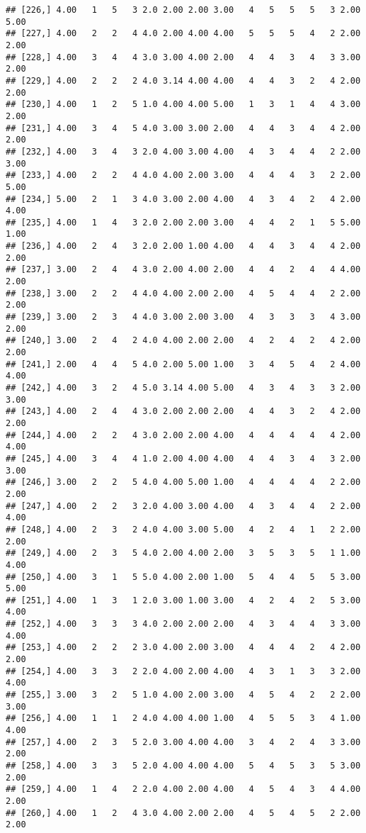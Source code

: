 \documentclass[]{article}
\begin{document}
\begin{verbatim}
## [226,] 4.00   1   5   3 2.0 2.00 2.00 3.00   4   5   5   5   3 2.00 5.00
## [227,] 4.00   2   2   4 4.0 2.00 4.00 4.00   5   5   5   4   2 2.00 2.00
## [228,] 4.00   3   4   4 3.0 3.00 4.00 2.00   4   4   3   4   3 3.00 2.00
## [229,] 4.00   2   2   2 4.0 3.14 4.00 4.00   4   4   3   2   4 2.00 2.00
## [230,] 4.00   1   2   5 1.0 4.00 4.00 5.00   1   3   1   4   4 3.00 2.00
## [231,] 4.00   3   4   5 4.0 3.00 3.00 2.00   4   4   3   4   4 2.00 2.00
## [232,] 4.00   3   4   3 2.0 4.00 3.00 4.00   4   3   4   4   2 2.00 3.00
## [233,] 4.00   2   2   4 4.0 4.00 2.00 3.00   4   4   4   3   2 2.00 5.00
## [234,] 5.00   2   1   3 4.0 3.00 2.00 4.00   4   3   4   2   4 2.00 4.00
## [235,] 4.00   1   4   3 2.0 2.00 2.00 3.00   4   4   2   1   5 5.00 1.00
## [236,] 4.00   2   4   3 2.0 2.00 1.00 4.00   4   4   3   4   4 2.00 2.00
## [237,] 3.00   2   4   4 3.0 2.00 4.00 2.00   4   4   2   4   4 4.00 2.00
## [238,] 3.00   2   2   4 4.0 4.00 2.00 2.00   4   5   4   4   2 2.00 2.00
## [239,] 3.00   2   3   4 4.0 3.00 2.00 3.00   4   3   3   3   4 3.00 2.00
## [240,] 3.00   2   4   2 4.0 4.00 2.00 2.00   4   2   4   2   4 2.00 2.00
## [241,] 2.00   4   4   5 4.0 2.00 5.00 1.00   3   4   5   4   2 4.00 4.00
## [242,] 4.00   3   2   4 5.0 3.14 4.00 5.00   4   3   4   3   3 2.00 3.00
## [243,] 4.00   2   4   4 3.0 2.00 2.00 2.00   4   4   3   2   4 2.00 2.00
## [244,] 4.00   2   2   4 3.0 2.00 2.00 4.00   4   4   4   4   4 2.00 4.00
## [245,] 4.00   3   4   4 1.0 2.00 4.00 4.00   4   4   3   4   3 2.00 3.00
## [246,] 3.00   2   2   5 4.0 4.00 5.00 1.00   4   4   4   4   2 2.00 2.00
## [247,] 4.00   2   2   3 2.0 4.00 3.00 4.00   4   3   4   4   2 2.00 4.00
## [248,] 4.00   2   3   2 4.0 4.00 3.00 5.00   4   2   4   1   2 2.00 2.00
## [249,] 4.00   2   3   5 4.0 2.00 4.00 2.00   3   5   3   5   1 1.00 4.00
## [250,] 4.00   3   1   5 5.0 4.00 2.00 1.00   5   4   4   5   5 3.00 5.00
## [251,] 4.00   1   3   1 2.0 3.00 1.00 3.00   4   2   4   2   5 3.00 4.00
## [252,] 4.00   3   3   3 4.0 2.00 2.00 2.00   4   3   4   4   3 3.00 4.00
## [253,] 4.00   2   2   2 3.0 4.00 2.00 3.00   4   4   4   2   4 2.00 2.00
## [254,] 4.00   3   3   2 2.0 4.00 2.00 4.00   4   3   1   3   3 2.00 4.00
## [255,] 3.00   3   2   5 1.0 4.00 2.00 3.00   4   5   4   2   2 2.00 3.00
## [256,] 4.00   1   1   2 4.0 4.00 4.00 1.00   4   5   5   3   4 1.00 4.00
## [257,] 4.00   2   3   5 2.0 3.00 4.00 4.00   3   4   2   4   3 3.00 2.00
## [258,] 4.00   3   3   5 2.0 4.00 4.00 4.00   5   4   5   3   5 3.00 2.00
## [259,] 4.00   1   4   2 2.0 4.00 2.00 4.00   4   5   4   3   4 4.00 2.00
## [260,] 4.00   1   2   4 3.0 4.00 2.00 2.00   4   5   4   5   2 2.00 2.00

\end{verbatim}
\end{document}
